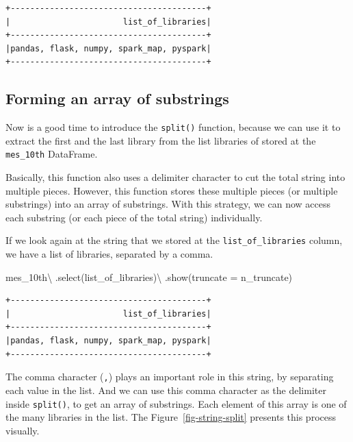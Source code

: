\documentclass[
  11pt,
  letterpaper,
  DIV=11,
  numbers=noendperiod]{scrreprt}
\newenvironment{Shaded}{\begin{snugshade}}{\end{snugshade}}
\newcommand{\NormalTok}[1]{\textcolor[rgb]{0.00,0.23,0.31}{#1}}
\newcommand{\OperatorTok}[1]{\textcolor[rgb]{0.37,0.37,0.37}{#1}}
\newcommand{\StringTok}[1]{\textcolor[rgb]{0.13,0.47,0.30}{#1}}
\begin{document}
\begin{verbatim}
+----------------------------------------+
|                       list_of_libraries|
+----------------------------------------+
|pandas, flask, numpy, spark_map, pyspark|
+----------------------------------------+
\end{verbatim}

\hypertarget{forming-an-array-of-substrings}{%
\subsection{Forming an array of
substrings}\label{forming-an-array-of-substrings}}

Now is a good time to introduce the \texttt{split()} function, because
we can use it to extract the first and the last library from the list
libraries of stored at the \texttt{mes\_10th} DataFrame.

Basically, this function also uses a delimiter character to cut the
total string into multiple pieces. However, this function stores these
multiple pieces (or multiple substrings) into an array of substrings.
With this strategy, we can now access each substring (or each piece of
the total string) individually.

If we look again at the string that we stored at the
\texttt{list\_of\_libraries} column, we have a list of libraries,
separated by a comma.

\begin{Shaded}
\begin{Highlighting}[]
\NormalTok{mes\_10th}\OperatorTok{\textbackslash{}}
\NormalTok{    .select(}\StringTok{\textquotesingle{}list\_of\_libraries\textquotesingle{}}\NormalTok{)}\OperatorTok{\textbackslash{}}
\NormalTok{    .show(truncate }\OperatorTok{=}\NormalTok{ n\_truncate)}
\end{Highlighting}
\end{Shaded}

\begin{verbatim}
+----------------------------------------+
|                       list_of_libraries|
+----------------------------------------+
|pandas, flask, numpy, spark_map, pyspark|
+----------------------------------------+
\end{verbatim}

The comma character (\texttt{,}) plays an important role in this string,
by separating each value in the list. And we can use this comma
character as the delimiter inside \texttt{split()}, to get an array of
substrings. Each element of this array is one of the many libraries in
the list. The Figure~\ref{fig-string-split} presents this process
visually.
\end{document}

